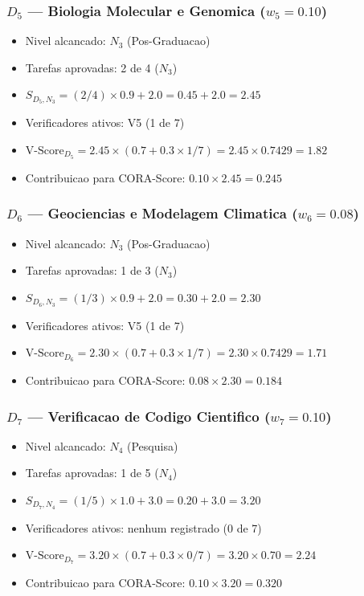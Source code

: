 \subsubsection{$D_5$ --- Biologia Molecular e Genomica ($w_{5}=0.10$)}

\begin{itemize}
\item Nivel alcancado: $N_3$ (Pos-Graduacao)
\item Tarefas aprovadas: 2 de 4 ($N_3$)
\item $S_{D_5,N_3} = (2/4) \times 0.9 + 2.0 = 0.45 + 2.0 = 2.45$
\item Verificadores ativos: V5 (1 de 7)
\item $\text{V-Score}_{D_5} = 2.45 \times (0.7 + 0.3 \times 1/7) = 2.45 \times 0.7429 = 1.82$
\item Contribuicao para CORA-Score: $0.10 \times 2.45 = 0.245$
\end{itemize}

\subsubsection{$D_6$ --- Geociencias e Modelagem Climatica ($w_{6}=0.08$)}

\begin{itemize}
\item Nivel alcancado: $N_3$ (Pos-Graduacao)
\item Tarefas aprovadas: 1 de 3 ($N_3$)
\item $S_{D_6,N_3} = (1/3) \times 0.9 + 2.0 = 0.30 + 2.0 = 2.30$
\item Verificadores ativos: V5 (1 de 7)
\item $\text{V-Score}_{D_6} = 2.30 \times (0.7 + 0.3 \times 1/7) = 2.30 \times 0.7429 = 1.71$
\item Contribuicao para CORA-Score: $0.08 \times 2.30 = 0.184$
\end{itemize}

\subsubsection{$D_7$ --- Verificacao de Codigo Cientifico ($w_{7}=0.10$)}

\begin{itemize}
\item Nivel alcancado: $N_4$ (Pesquisa)
\item Tarefas aprovadas: 1 de 5 ($N_4$)
\item $S_{D_7,N_4} = (1/5) \times 1.0 + 3.0 = 0.20 + 3.0 = 3.20$
\item Verificadores ativos: nenhum registrado (0 de 7)
\item $\text{V-Score}_{D_7} = 3.20 \times (0.7 + 0.3 \times 0/7) = 3.20 \times 0.70 = 2.24$
\item Contribuicao para CORA-Score: $0.10 \times 3.20 = 0.320$
\end{itemize}

